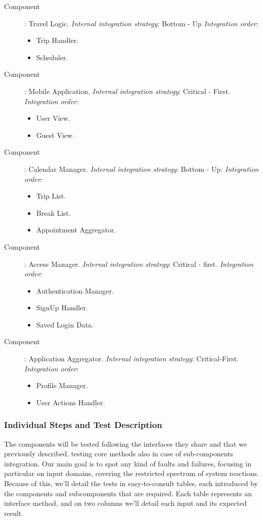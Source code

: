 \begin{description}
	\item[Component]: Travel Logic.
		\textit{Internal integration strategy}: Bottom - Up
		\textit{Integration order}:
		\begin{itemize}	
			\item Trip Handler.
			\item Scheduler.
		\end{itemize}
	
	\item[Component]: Mobile Application.
		\textit{Internal integration strategy}: Critical - First.
		\textit{Integration order}:
		\begin{itemize}
			\item User View.
			\item Guest View.
		\end{itemize}
	
	\item[Component]: Calendar Manager.
	\textit{Internal integration strategy}: Bottom - Up.
	\textit{Integration order}:
	\begin{itemize}
		\item Trip List.
		\item Break List.
		\item Appointment Aggregator.
	\end{itemize}

	\item[Component]: Access Manager.
		\textit{Internal integration strategy}: Critical - first.
		\textit{Integration order}:
		\begin{itemize}
			\item Authentication Manager.
			\item SignUp Handler.
			\item Saved Login Data.
		\end{itemize}
		
	\item[Component]: Application Aggregator.
		\textit{Internal integration strategy}: Critical-First.
		\textit{Integration order}:
		\begin{itemize}
			\item Profile Manager.
			\item User Actions Handler.
		\end{itemize}
		
	\end{description}

\subsubsection{Individual Steps and Test Description}
 
	The components will be tested following the interfaces they share and that we previously described, testing core methods also in case of sub-components integration.
	Our main goal is to spot any kind of faults and failures, focusing in particular on input domains, covering the restricted spectrum of system reactions.
	Because of this, we'll detail the tests in easy-to-consult tables, each introduced by the components and subcomponents that are required.
	Each table represents an interface method, and on two columns we'll detail each input and its expected result.